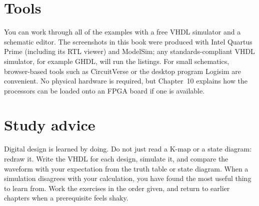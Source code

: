 \section*{Tools}
You can work through all of the examples with a free VHDL simulator and a schematic editor. The screenshots in this book were produced with
Intel Quartus Prime (including its RTL viewer) and ModelSim; any standards-compliant VHDL simulator, for example GHDL, will run the listings.
For small schematics, browser-based tools such as CircuitVerse or the desktop program Logisim are convenient.
No physical hardware is required, but Chapter~10 explains how the processors can be loaded onto an FPGA board if one is available.

\section*{Study advice}
Digital design is learned by doing. Do not just read a K-map or a state diagram: redraw it. Write the VHDL for each design, simulate it, and
compare the waveform with your expectation from the truth table or state diagram. When a simulation disagrees with your calculation,
you have found the most useful thing to learn from. Work the exercises in the order given, and return to earlier chapters when a prerequisite feels shaky.
\clearpage
